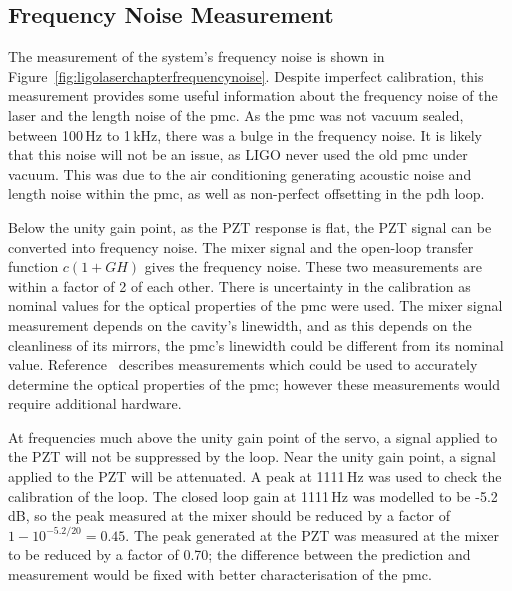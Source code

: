 \subsection{Frequency Noise Measurement}
The measurement of the system's frequency noise is shown in Figure~\ref{fig:ligolaserchapterfrequencynoise}. Despite imperfect calibration, this measurement provides some useful information about the frequency noise of the laser and the length noise of the \gls{pmc}. As the \gls{pmc} was not vacuum sealed, between 100\,Hz to 1\,kHz, there was a bulge in the frequency noise. It is likely that this noise will not be an issue, as LIGO never used the old \gls{pmc} under vacuum. This was due to the air conditioning generating acoustic noise and length noise within the \gls{pmc}, as well as non-perfect offsetting in the \gls{pdh} loop. 
\par
Below the unity gain point, as the PZT response is flat, the PZT signal can be converted into frequency noise. The mixer signal and the open-loop transfer function $c(1+GH)$ gives the frequency noise. These two measurements are within a factor of 2 of each other. There is uncertainty in the calibration as nominal values for the optical properties of the \gls{pmc} were used. The mixer signal measurement depends on the cavity's linewidth, and as this depends on the cleanliness of its mirrors, the \gls{pmc}'s linewidth could be different from its nominal value.  Reference~\cite{Uehara1995} describes measurements which could be used to accurately determine the optical properties of the \gls{pmc}; however these measurements would require additional hardware. 
\par
At frequencies much above the unity gain point of the servo, a signal applied to the PZT will not be suppressed by the loop. Near the unity gain point, a signal applied to the PZT will be attenuated. A peak at 1111\,Hz was used to check the calibration of the loop. The closed loop gain at 1111\,Hz was modelled to be -5.2\,dB, so the peak measured at the mixer should be reduced by a factor of $1-10^{-5.2/20} = 0.45$. The peak generated at the PZT was measured at the mixer to be reduced by a factor of 0.70; the difference between the prediction and measurement would be fixed with better characterisation of the \gls{pmc}.
\par


